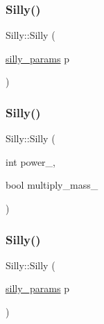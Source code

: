 \mbox{\label{classSilly_a38cdb22dcb5efdd420553d1fd6810b8e}} 
\subsubsection{\texorpdfstring{Silly()}{Silly()}\hspace{0.1cm}{\footnotesize\ttfamily [2/4]}}
{\footnotesize\ttfamily Silly\+::\+Silly (\begin{DoxyParamCaption}\item[{\mbox{\hyperlink{structsilly__params}{silly\+\_\+params}}}]{p }\end{DoxyParamCaption})\hspace{0.3cm}{\ttfamily [inline]}}

\mbox{\label{classSilly_aff8a69219d52c64960009dbfeee78fda}} 
\subsubsection{\texorpdfstring{Silly()}{Silly()}\hspace{0.1cm}{\footnotesize\ttfamily [3/4]}}
{\footnotesize\ttfamily Silly\+::\+Silly (\begin{DoxyParamCaption}\item[{int}]{power\+\_\+,  }\item[{bool}]{multiply\+\_\+mass\+\_\+ }\end{DoxyParamCaption})\hspace{0.3cm}{\ttfamily [inline]}}

\mbox{\label{classSilly_a38cdb22dcb5efdd420553d1fd6810b8e}} 
\subsubsection{\texorpdfstring{Silly()}{Silly()}\hspace{0.1cm}{\footnotesize\ttfamily [4/4]}}
{\footnotesize\ttfamily Silly\+::\+Silly (\begin{DoxyParamCaption}\item[{\mbox{\hyperlink{structsilly__params}{silly\+\_\+params}}}]{p }\end{DoxyParamCaption})\hspace{0.3cm}{\ttfamily [inline]}}




